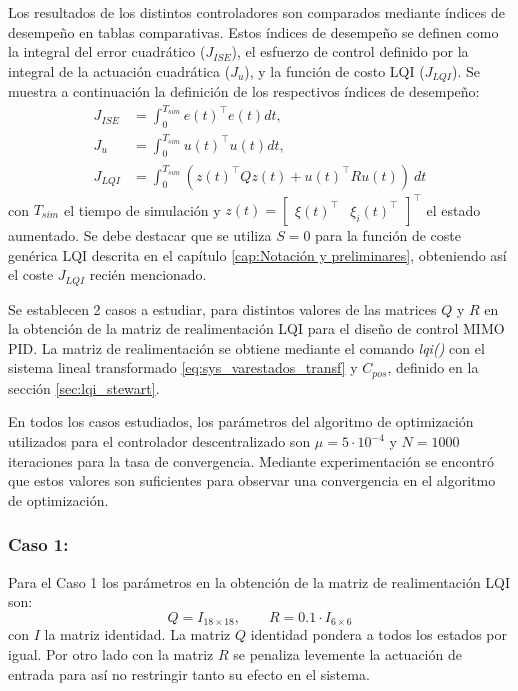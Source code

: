 Los resultados de los distintos controladores son comparados mediante índices de desempeño en tablas comparativas. Estos índices de desempeño se definen como la integral del error cuadrático ($J_{ISE}$), el esfuerzo de control definido por la integral de la actuación cuadrática ($J_u$), y la función de costo LQI ($J_{LQI}$). Se muestra a continuación la definición de los respectivos índices de desempeño:
\begin{align} \label{eq:indices_desempeño}   
    J_{ISE} & = \int_0^{T_{sim}} e(t)^\top e(t) dt, \\ 
    J_{u} & = \int_0^{T_{sim}} u(t)^\top u(t) dt,\\
    J_{LQI} & =\int_0^{T_{sim}} \left( z(t)^{\top}Qz(t) + u(t)^{\top}Ru(t) \right) \ dt
\end{align}
con $T_{sim}$ el tiempo de simulación y $z(t)=\begin{bmatrix} \xi(t)^{\top} & \xi_i(t)^{\top} \end{bmatrix}^{\top}$ el estado aumentado. Se debe destacar que se utiliza $S=0$ para la función de coste genérica LQI descrita en el capítulo \ref{cap:Notación y preliminares}, obteniendo así el coste $J_{LQI}$ recién mencionado.

Se establecen 2 casos a estudiar, para distintos valores de las matrices $Q$ y $R$ en la obtención de la matriz de realimentación LQI para el diseño de control MIMO PID. La matriz de realimentación se obtiene mediante el comando \textit{lqi()} con el sistema lineal transformado \ref{eq:sys_varestados_transf} y $C_{pos}$, definido en la sección \ref{sec:lqi_stewart}.

En todos los casos estudiados, los parámetros del algoritmo de optimización utilizados para el controlador descentralizado son $\mu=5\cdot 10^{-4}$ y $N=1000$ iteraciones para la tasa de convergencia. Mediante experimentación se encontró que estos valores son suficientes para observar una convergencia en el algoritmo de optimización.

\subsubsection{Caso 1:}
Para el Caso 1 los parámetros en la obtención de la matriz de realimentación LQI son:
\begin{equation}
    Q = I_{18\times18}, \qquad R = 0.1\cdot I_{6\times6}
\end{equation}
con $I$ la matriz identidad. La matriz $Q$ identidad pondera a todos los estados por igual. Por otro lado con la matriz $R$ se penaliza levemente la actuación de entrada para así no restringir tanto su efecto en el sistema.

